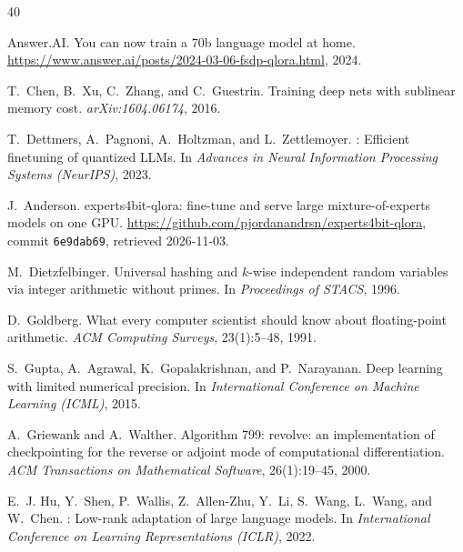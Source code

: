 \documentclass[11pt,letterpaper]{article}
\theoremstyle{definition}
\theoremstyle{plain}
\begin{document}
\begingroup
\small
\setlength{\bibsep}{3pt plus 1pt}

\begin{thebibliography}{40}

Answer.AI.
\newblock You can now train a 70b language model at home.
\newblock \url{https://www.answer.ai/posts/2024-03-06-fsdp-qlora.html}, 2024.

T.~Chen, B.~Xu, C.~Zhang, and C.~Guestrin.
\newblock Training deep nets with sublinear memory cost.
\newblock \emph{arXiv:1604.06174}, 2016.

T.~Dettmers, A.~Pagnoni, A.~Holtzman, and L.~Zettlemoyer.
: Efficient finetuning of quantized {LLMs}.
\newblock In \emph{Advances in Neural Information Processing Systems (NeurIPS)}, 2023.

J.~Anderson.
\newblock experts4bit-qlora: fine-tune and serve large mixture-of-experts models on one {GPU}.
\newblock \url{https://github.com/pjordanandrsn/experts4bit-qlora}, commit \texttt{6e9dab69}, retrieved 2026-11-03.

M.~Dietzfelbinger.
\newblock Universal hashing and $k$-wise independent random variables via integer arithmetic without primes.
\newblock In \emph{Proceedings of STACS}, 1996.

D.~Goldberg.
\newblock What every computer scientist should know about floating-point arithmetic.
\newblock \emph{ACM Computing Surveys}, 23(1):5--48, 1991.

S.~Gupta, A.~Agrawal, K.~Gopalakrishnan, and P.~Narayanan.
\newblock Deep learning with limited numerical precision.
\newblock In \emph{International Conference on Machine Learning (ICML)}, 2015.

A.~Griewank and A.~Walther.
\newblock Algorithm 799: revolve: an implementation of checkpointing for the reverse or adjoint mode of computational differentiation.
\newblock \emph{ACM Transactions on Mathematical Software}, 26(1):19--45, 2000.

E.~J. Hu, Y.~Shen, P.~Wallis, Z.~Allen-Zhu, Y.~Li, S.~Wang, L.~Wang, and W.~Chen.
: Low-rank adaptation of large language models.
\newblock In \emph{International Conference on Learning Representations (ICLR)}, 2022.


\end{thebibliography}
\end{document}
